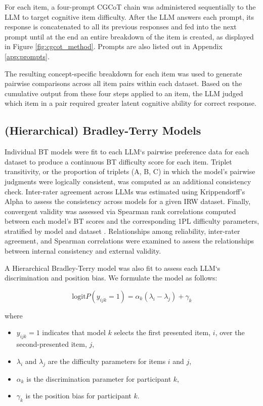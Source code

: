 \documentclass[11pt]{article}
\begin{document}
For each item, a four-prompt CGCoT chain was administered sequentially to the LLM to target cognitive item difficulty. After the LLM answers each prompt, its response is concatenated to all its previous responses and fed into the next prompt until at the end an entire breakdown of the item is created, as displayed in Figure \ref{fig:cgcot_method}. Prompts are also listed out in Appendix \ref{app:prompts}. 

The resulting concept-specific breakdown for each item was used to generate pairwise comparisons across all item pairs within each dataset. Based on the cumulative output from these four steps applied to an item, the LLM judged which item in a pair required greater latent cognitive ability for correct response. 

\subsection{(Hierarchical) Bradley-Terry Models}
\label{subsec:bradley-terry}

Individual BT models were fit to each LLM`s pairwise preference data for each dataset to produce a continuous BT difficulty score for each item. Triplet transitivity, or the proportion of triplets (A, B, C) in which the model's pairwise judgments were logically consistent, was computed as an additional consistency check. Inter-rater agreement across LLMs was estimated using Krippendorff's Alpha \citep{hayesAnsweringCallStandard2007} to assess the consistency across models for a given IRW dataset. Finally, convergent validity was assessed via Spearman rank correlations computed between each model's BT scores and the corresponding 1PL difficulty parameters, stratified by model and dataset \citep{spearmanProofMeasurementAssociation1904}. Relationships among reliability, inter-rater agreement, and Spearman correlations were examined to assess the relationships between internal consistency and external validity.

A Hierarchical Bradley-Terry model was also fit to assess each LLM`s discrimination and position bias. We formulate the model as follows:

\[
\text{logit}P(y_{ijk} = 1) = \alpha_k(\lambda_i - \lambda_j) + \gamma_k
\]

where 
\begin{itemize}
  \item $y_{ijk} = 1$ indicates that model $k$ selects the first presented item, $i$, over the second-presented item, $j$,
  \item $\lambda_i$ and $\lambda_j$ are the difficulty parameters for items $i$ and $j$,
  \item $\alpha_k$ is the discrimination parameter for participant $k$,
  \item $\gamma_k$ is the position bias for participant $k$.
\end{itemize}
\end{document}
